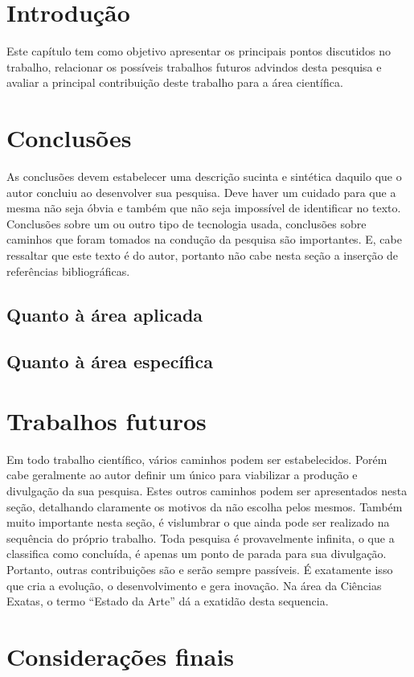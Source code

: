 \section{Introdução}
Este capítulo tem como objetivo apresentar os principais pontos discutidos no trabalho, relacionar os possíveis trabalhos futuros advindos desta pesquisa e avaliar a principal contribuição deste trabalho para a área científica.





\section{Conclusões}

As conclusões devem estabelecer uma descrição sucinta e sintética daquilo que o autor concluiu ao desenvolver sua pesquisa. Deve haver um cuidado para que a mesma não seja óbvia e também que não seja impossível de identificar no texto. Conclusões sobre um ou outro tipo de tecnologia usada, conclusões sobre caminhos que foram tomados na condução da pesquisa são importantes. E, cabe ressaltar que este texto é do autor, portanto não cabe nesta seção a inserção de referências bibliográficas.

\subsection{Quanto à área aplicada}




\subsection{Quanto à área específica}



\section{Trabalhos futuros}


Em todo trabalho científico, vários caminhos podem ser estabelecidos. Porém cabe geralmente ao autor definir um único para viabilizar a produção e divulgação da sua pesquisa. Estes outros caminhos podem ser apresentados nesta seção, detalhando claramente os motivos da não escolha pelos mesmos. 
Também muito importante nesta seção, é vislumbrar o que ainda pode ser realizado na sequência do próprio trabalho. Toda pesquisa é provavelmente infinita, o que a classifica como concluída, é apenas um ponto de parada para sua divulgação. Portanto, outras contribuições são e serão sempre passíveis. É exatamente isso que cria a evolução, o desenvolvimento e gera inovação. Na área da Ciências Exatas, o termo “Estado da Arte” dá a exatidão desta sequencia. 


\section{Considerações finais}

